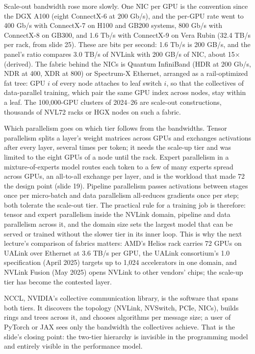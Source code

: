 \documentclass[11pt,letterpaper]{article}
\begin{document}
Scale-out bandwidth rose more slowly. One NIC per GPU is the convention since the DGX A100 (eight ConnectX-6 at 200 Gb/s), and the per-GPU rate went to 400 Gb/s with ConnectX-7 on H100 and GB200 systems, 800 Gb/s with ConnectX-8 on GB300, and 1.6 Tb/s with ConnectX-9 on Vera Rubin (32.4 TB/s per rack, from slide 25). These are bits per second: 1.6 Tb/s is 200 GB/s, and the panel's ratio compares 3.0 TB/s of NVLink with 200 GB/s of NIC, about 15$\times$ (derived). The fabric behind the NICs is Quantum InfiniBand (HDR at 200 Gb/s, NDR at 400, XDR at 800) or Spectrum-X Ethernet, arranged as a rail-optimized fat tree: GPU $i$ of every node attaches to leaf switch $i$, so that the collectives of data-parallel training, which pair the same GPU index across nodes, stay within a leaf. The 100,000-GPU clusters of 2024--26 are scale-out constructions, thousands of NVL72 racks or HGX nodes on such a fabric.

Which parallelism goes on which tier follows from the bandwidths. Tensor parallelism splits a layer's weight matrices across GPUs and exchanges activations after every layer, several times per token; it needs the scale-up tier and was limited to the eight GPUs of a node until the rack. Expert parallelism in a mixture-of-experts model routes each token to a few of many experts spread across GPUs, an all-to-all exchange per layer, and is the workload that made 72 the design point (slide 19). Pipeline parallelism passes activations between stages once per micro-batch and data parallelism all-reduces gradients once per step; both tolerate the scale-out tier. The practical rule for a training job is therefore: tensor and expert parallelism inside the NVLink domain, pipeline and data parallelism across it, and the domain size sets the largest model that can be served or trained without the slower tier in its inner loop. This is why the next lecture's comparison of fabrics matters: AMD's Helios rack carries 72 GPUs on UALink over Ethernet at 3.6 TB/s per GPU, the UALink consortium's 1.0 specification (April 2025) targets up to 1,024 accelerators in one domain, and NVLink Fusion (May 2025) opens NVLink to other vendors' chips; the scale-up tier has become the contested layer.

NCCL, NVIDIA's collective communication library, is the software that spans both tiers. It discovers the topology (NVLink, NVSwitch, PCIe, NICs), builds rings and trees across it, and chooses algorithms per message size; a user of PyTorch or JAX sees only the bandwidth the collectives achieve. That is the slide's closing point: the two-tier hierarchy is invisible in the programming model and entirely visible in the performance model.
\end{document}
